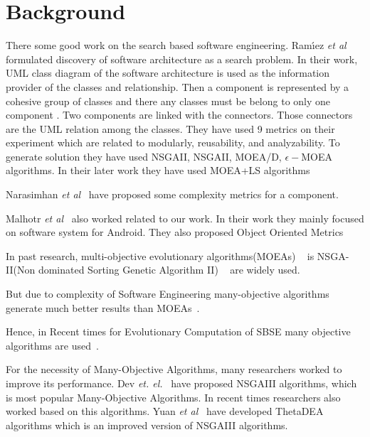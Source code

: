 \documentclass[letterpaper, 10 pt, conference]{ieeeconf}  %
\begin{document}
\section{Background}


There some good work on the search based software engineering. 
Ram{\'\i}ez \textit{et al}~\cite{ramirez2015approach} formulated discovery of software architecture as a search problem.
In their work, UML class diagram of the software architecture is used as the information provider of the classes and relationship. Then a component is represented by a cohesive group of classes and there any classes must be belong to only one component \cite{ramirez2016comparative}. Two components are linked with the connectors. Those connectors are the UML relation among the classes. They have used 9 metrics on their experiment which are related to modularly, reusability, and analyzability. To generate solution they have used NSGAII, NSGAII, MOEA/D, $\epsilon - $MOEA algorithms. In their later work they have used MOEA+LS algorithms~\cite{ramirez2017effect}

Narasimhan \textit{et al}~\cite{narasimhan2004new} have proposed some complexity metrics for a component. 

Malhotr  \textit{et al}~\cite{malhotra2017exploratory} also worked related to our work. In their work they mainly focused on software system for Android. They also proposed Object Oriented Metrics 


In past research, multi-objective evolutionary algorithms(MOEAs) ~\cite{zhou2011multiobjective} is NSGA-II(Non dominated Sorting Genetic Algorithm II) ~\cite{deb2002fast} are widely used.

But due to complexity of Software Engineering many-objective algorithms generate much better results than MOEAs~\cite{purshouse2007evolutionary, coello2007evolutionary}. 

Hence, in Recent times for Evolutionary Computation of SBSE many objective algorithms are used~\cite{ramirez2016comparative,bader2011hype, yang2013grid, zhang2007moea}.

For the necessity of Many-Objective Algorithms, many researchers worked to improve its performance. Dev \textit{et. el.}~\cite{deb2014evolutionary} have proposed NSGAIII algorithms, which is most popular Many-Objective Algorithms. In recent times researchers also worked based on this algorithms. Yuan \textit{et al}~\cite{yuan2016new} have developed ThetaDEA algorithms which is an improved version of NSGAIII algorithms. 
\end{document}
